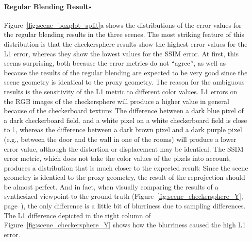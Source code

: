 \paragraph{Regular Blending Results}
Figure~\ref{fig:scene_boxplot_split}a shows the distributions of the error values for the regular blending results in the three scenes. The most striking feature of this distribution is that the checkersphere results show the highest error values for the L1 error, whereas they show the lowest values for the SSIM error. At first, this seems surprising, both because the error metrics do not ``agree'', as well as because the results of the regular blending are expected to be very good since the scene geometry is identical to the proxy geometry. The reason for the ambiguous results is the sensitivity of the L1 metric to different color values. L1 errors on the RGB images of the checkersphere will produce a higher value in general because of the checkerboard texture:
The difference between a dark blue pixel of a dark checkerboard field, and a white pixel on a white checkerboard field is close to 1, whereas the difference between a dark brown pixel and a dark purple pixel (e.g., between the door and the wall in one of the rooms) will produce a lower error value, although the distortion or displacement may be identical. The SSIM error metric, which does not take the color values of the pixels into account, produces a distribution that is much closer to the expected result: Since the scene geometry is identical to the proxy geometry, the result of the reprojection should be almost perfect. And in fact, when visually comparing the results of a synthesized viewpoint to the ground truth (Figure~\ref{fig:scene_checkersphere_Y}, page~\pageref{fig:scene_checkersphere_Y}), the only difference is a little bit of blurriness due to sampling differences. The L1 difference depicted in the right column of Figure~\ref{fig:scene_checkersphere_Y} shows how the blurriness caused the high L1 error.

